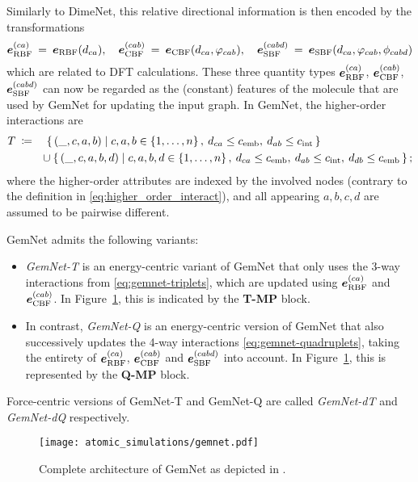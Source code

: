 Similarly to DimeNet, this relative directional information is then encoded by the
transformations
\[
    \boldsymbol{e}_{\text{RBF}}^{(ca)} \: = \: \boldsymbol{e}_{\text{RBF}}(d_{ca}), 
    \quad \boldsymbol{e}_{\text{CBF}}^{(cab)} \: = \: \boldsymbol{e}_{\text{CBF}}(d_{ca}, \varphi_{cab}),
    \quad \boldsymbol{e}_{\text{SBF}}^{(cabd)} \: = \: \boldsymbol{e}_{\text{SBF}}(d_{ca}, \varphi_{cab}, \phi_{cabd}) 
\]
which are related to DFT calculations.
These three quantity types $\boldsymbol{e}_{\text{RBF}}^{(ca)}$, $\boldsymbol{e}_{\text{CBF}}^{(cab)}$, $\boldsymbol{e}_{\text{SBF}}^{(cabd)}$ 
can now be regarded as the (constant) features of the
molecule that are used by GemNet for updating the input graph.
In GemNet, the higher-order interactions are
\begin{align}
    T \: &\coloneqq \quad 
    \left\{\, (\_, c, a, b) \; \middle| \; c, a, b \in \left\{1, \dots, n\right\}, 
    \: d_{ca} \leq c_{\text{emb}}, \: d_{ab} \leq c_{\text{int}} \,\right\} \label{eq:gemnet-triplets} \\
    &\qquad \cup  \left\{\, (\_, c, a, b, d) \; \middle| \; c, a, b, d \in \left\{1, \dots, n\right\}, 
    \: d_{ca} \leq c_{\text{emb}}, \: d_{ab} \leq c_{\text{int}}, 
    \: d_{db} \leq c_{\text{emb}} \,\right\}; \label{eq:gemnet-quadruplets}
\end{align}
where the higher-order attributes are indexed by the involved nodes (contrary 
to the definition in \eqref{eq:higher_order_interact}), and all appearing $a, b, c, d$ 
are assumed to be pairwise different.

GemNet admits the following variants:
\begin{itemize}
    \item \textit{GemNet-T} is an energy-centric variant of GemNet that only uses the 3-way 
          interactions from \eqref{eq:gemnet-triplets}, which are updated 
          using $\boldsymbol{e}_{\text{RBF}}^{(ca)}$ and $\boldsymbol{e}_{\text{CBF}}^{(cab)}$.
          In Figure~\ref{fig:gemnet}, this is indicated by the 
          \textbf{\textcolor{tum-orange}{T}-MP} block.
    \item In contrast, \textit{GemNet-Q} is an energy-centric version of GemNet
          that also successively updates the 4-way interactions \eqref{eq:gemnet-quadruplets},
          taking the entirety of $\boldsymbol{e}_{\text{RBF}}^{(ca)}$, $\boldsymbol{e}_{\text{CBF}}^{(cab)}$
          and $\boldsymbol{e}_{\text{SBF}}^{(cabd)}$ into account. In Figure~\ref{fig:gemnet}, this 
          is represented by the \textbf{\textcolor{tum-green}{Q}-MP} block.
\end{itemize}
Force-centric versions of GemNet-T and GemNet-Q are called \textit{GemNet-dT}
and \textit{GemNet-dQ} respectively.

\begin{figure}[H]
    \centering
    \texttt{[image: atomic\_simulations/gemnet.pdf]}
    \caption{Complete architecture of GemNet as depicted in 
    \cite[Appendix F]{https://doi.org/10.48550/arxiv.2106.08903}.}
    \label{fig:gemnet}
\end{figure}
